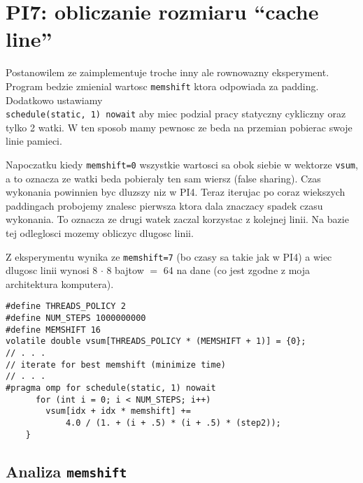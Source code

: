 \documentclass{bmvc2k}
\begin{document}
\section{PI7: obliczanie rozmiaru ``cache line''}

Postanowilem ze zaimplementuje troche inny ale rownowazny eksperyment.
Program bedzie zmienial wartosc {\tt memshift} ktora odpowiada za padding.
Dodatkowo ustawiamy \\ {\tt schedule(static, 1) nowait} aby miec podzial pracy
statyczny cykliczny oraz tylko 2 watki. W ten sposob mamy pewnosc ze beda na
przemian pobierac swoje linie pamieci.

Napoczatku kiedy {\tt memshift=0} wszystkie wartosci sa obok siebie w wektorze
{\tt vsum}, a to oznacza ze watki beda pobieraly ten sam wiersz (false sharing).
Czas wykonania powinnien byc dluzszy niz w PI4. Teraz iterujac po coraz
wiekszych paddingach probojemy znalesc pierwsza ktora dala znaczacy spadek czasu
wykonania. To oznacza ze drugi watek zaczal korzystac z kolejnej linii.
Na bazie tej odleglosci mozemy obliczyc dlugosc linii.

Z eksperymentu wynika ze {\tt memshift=7} (bo czasy sa takie jak w PI4)
a wiec dlugosc linii wynosi 8 $\cdot$ 8 bajtow $=$ 64 na dane
(co jest zgodne z moja architektura komputera).

\begin{verbatim}
#define THREADS_POLICY 2
#define NUM_STEPS 1000000000
#define MEMSHIFT 16
volatile double vsum[THREADS_POLICY * (MEMSHIFT + 1)] = {0};
// . . .
// iterate for best memshift (minimize time)
// . . .
#pragma omp for schedule(static, 1) nowait
      for (int i = 0; i < NUM_STEPS; i++)
        vsum[idx + idx * memshift] +=
            4.0 / (1. + (i + .5) * (i + .5) * (step2));
    }
\end{verbatim}

\newpage

\subsection{Analiza {\tt memshift}}
\end{document}
